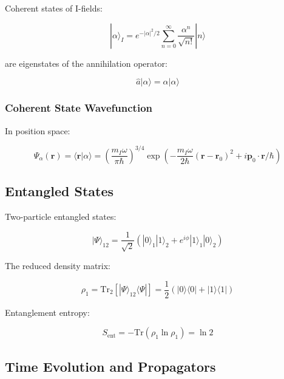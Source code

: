 Coherent states of I-fields:

\begin{equation}
\label{eq:coherent_state}
|\alpha\rangle_I = e^{-|\alpha|^2/2} \sum_{n=0}^\infty \frac{\alpha^n}{\sqrt{n!}} |n\rangle
\end{equation}

are eigenstates of the annihilation operator:

\begin{equation}
\label{eq:coherent_eigenvalue}
\hat{a}|\alpha\rangle = \alpha|\alpha\rangle
\end{equation}

\subsubsection{Coherent State Wavefunction}

In position space:

\begin{equation}
\label{eq:coherent_position}
\Psi_\alpha(\mathbf{r}) = \langle\mathbf{r}|\alpha\rangle = \left(\frac{m_I\omega}{\pi\hbar}\right)^{3/4} \exp\left(-\frac{m_I\omega}{2\hbar}(\mathbf{r}-\mathbf{r}_0)^2 + i\mathbf{p}_0\cdot\mathbf{r}/\hbar\right)
\end{equation}

\subsection{Entangled States}

Two-particle entangled states:

\begin{equation}
\label{eq:entangled_state}
|\Psi\rangle_{12} = \frac{1}{\sqrt{2}}(|0\rangle_1|1\rangle_2 + e^{i\phi}|1\rangle_1|0\rangle_2)
\end{equation}

The reduced density matrix:

\begin{equation}
\label{eq:reduced_density}
\rho_1 = \text{Tr}_2[|\Psi\rangle_{12}\langle\Psi|] = \frac{1}{2}(|0\rangle\langle 0| + |1\rangle\langle 1|)
\end{equation}

Entanglement entropy:

\begin{equation}
\label{eq:entanglement_entropy}
S_{\text{ent}} = -\text{Tr}(\rho_1 \ln \rho_1) = \ln 2
\end{equation}

\subsection{Time Evolution and Propagators}

